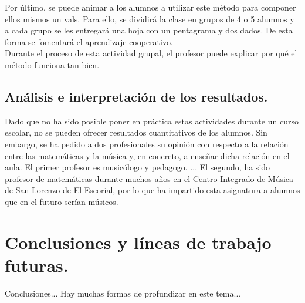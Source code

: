 \documentclass[a4paper, openright, 11pt, titlepage]{report}
\theoremstyle{definition}\newtheorem{defin}[propo]{Definition}
\theoremstyle{definition}\newtheorem{obser}[propo]{Remark}
\theoremstyle{definition}\newtheorem{ejem}[propo]{Ejemplo}
\theoremstyle{definition}\newtheorem{algoritmo}[propo]{Algoritmo}
\begin{document}
Por último, se puede animar a los alumnos a utilizar este método para componer ellos mismos un vals. Para ello, se dividirá la clase en grupos de 4 o 5 alumnos y a cada grupo se les entregará una hoja con un pentagrama y dos dados. De esta forma se fomentará el aprendizaje cooperativo.\\
Durante el proceso de esta actividad grupal, el profesor puede explicar por qué el método funciona tan bien.  

\section{Análisis e interpretación de los resultados.}
Dado que no ha sido posible poner en práctica estas actividades durante un curso escolar, no se pueden ofrecer resultados cuantitativos de los alumnos. Sin embargo, se ha pedido a dos profesionales su opinión con respecto a la relación entre las matemáticas y la música y, en concreto, a enseñar dicha relación en el aula. 
El primer profesor es musicólogo y pedagogo. ... 
El segundo, ha sido profesor de matemáticas durante muchos años en el Centro Integrado de Música de San Lorenzo de El Escorial, por lo que ha impartido esta asignatura a alumnos que en el futuro serían músicos. 
\chapter{Conclusiones y líneas de trabajo futuras.}
Conclusiones...
Hay muchas formas de profundizar en este tema... 
\newpage
\appendix
\end{document}
